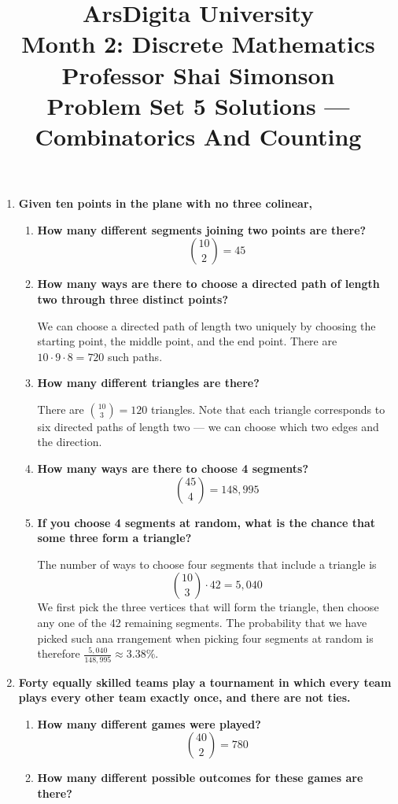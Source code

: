 \documentclass[12pt]{amsart}
\title[Problem Set 5 Solutions]{ArsDigita University\\Month 2:  Discrete Mathematics\\Professor Shai Simonson\\Problem Set 5 Solutions --- Combinatorics And Counting}
\begin{document}
\maketitle

\begin{enumerate}
\item {\bf Given ten points in the plane with no three colinear,}
\begin{enumerate}
\item {\bf How many different segments joining two points are there?}
$$
{10 \choose 2} = 45
$$
\item {\bf How many ways are there to choose a directed path of length two through three distinct points?}

We can choose a directed path of length two uniquely by choosing the
starting point, the middle point, and the end point.  There are $10
\cdot 9 \cdot 8 = 720$ such paths.

\item {\bf How many different triangles are there?}

There are ${10 \choose 3} = 120$ triangles.  Note that each triangle corresponds to six directed paths of length two --- we can choose which two edges and the direction.
\item {\bf How many ways are there to choose 4 segments?}
$${45 \choose 4} = 148,995$$
\item {\bf If you choose 4 segments at random, what is the chance that some three form a triangle?}

The number of ways to choose four segments that include a triangle is
$$
{10 \choose 3} \cdot 42 = 5,040
$$
We first pick the three vertices that will form the triangle, then choose any one of the 42 remaining segments.  The probability that we have picked such ana rrangement when picking four segments at random is therefore $\frac{5,040}{148,995} \approx 3.38\%$.
\end{enumerate}

\medskip

\item {\bf Forty equally skilled teams play a tournament in which every team plays every other team exactly once, and there are not ties.}

\begin{enumerate}
\item {\bf How many different games were played?}
$$
{40 \choose 2} = 780
$$
\item {\bf How many different possible outcomes for these games are
there?}


\end{enumerate}
\end{enumerate}
\end{document}
